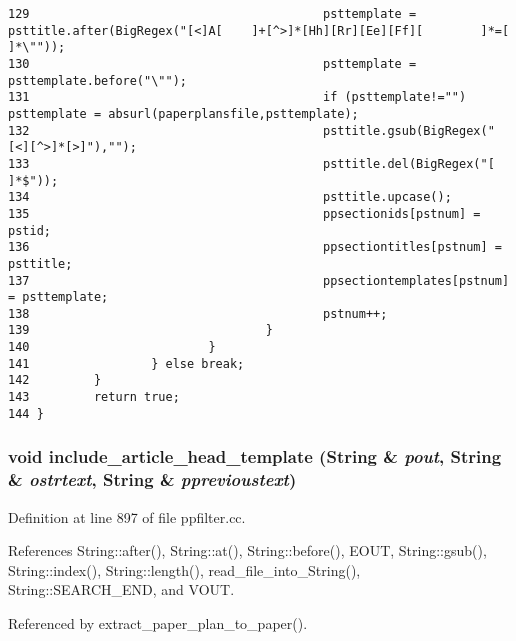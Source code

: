 \begin{verbatim}
129                                         psttemplate = psttitle.after(BigRegex("[<]A[    ]+[^>]*[Hh][Rr][Ee][Ff][        ]*=[    ]*\""));
130                                         psttemplate = psttemplate.before("\"");
131                                         if (psttemplate!="") psttemplate = absurl(paperplansfile,psttemplate);
132                                         psttitle.gsub(BigRegex("[<][^>]*[>]"),"");
133                                         psttitle.del(BigRegex("[        ]*$"));
134                                         psttitle.upcase();
135                                         ppsectionids[pstnum] = pstid;
136                                         ppsectiontitles[pstnum] = psttitle;
137                                         ppsectiontemplates[pstnum] = psttemplate;
138                                         pstnum++;
139                                 }
140                         }
141                 } else break;
142         }
143         return true;
144 }
\end{verbatim}\normalsize 
{}
\subsubsection{\setlength{\rightskip}{0pt plus 5cm}void include\_\-article\_\-head\_\-template ({\bf String} \& {\em pout}, {\bf String} \& {\em ostrtext}, {\bf String} \& {\em pprevioustext})}\label{ppfilter_8cc_a22}




Definition at line 897 of file ppfilter.cc.

References String::after(), String::at(), String::before(), EOUT, String::gsub(), String::index(), String::length(), read\_\-file\_\-into\_\-String(), String::SEARCH\_\-END, and VOUT.

Referenced by extract\_\-paper\_\-plan\_\-to\_\-paper().



